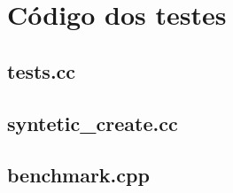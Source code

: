 \chapter{Código dos testes}
\label{apd:testes}

\section{tests.cc}


\section{syntetic_create.cc}

\section{benchmark.cpp}
